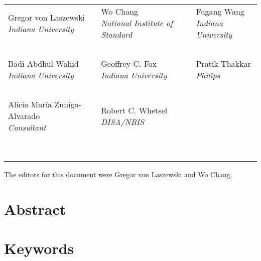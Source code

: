 \begin{center}
\parindent0pt 
\begin{tabular}{p{}p{}p{}}
 \makecell[l]{Gregor von Laszewski\\{\it Indiana University}} &
 \makecell[l]{Wo Chang\\{\it National Institute of Standard}} &
 \makecell[l]{Fugang Wang\\{\it Indiana University}}  \\
\multicolumn{3}{c}{~} \\
 \makecell[l]{Badi Abdhul Wahid\\{\it Indiana University}} & 
 \makecell[l]{Geoffrey C. Fox\\{\it Indiana University}} &
 \makecell[l]{Pratik Thakkar\\{\it Philips}} \\
\multicolumn{3}{c}{~} \\
 \makecell[l]{Alicia María Zuniga-Alvarado\\{\it Consultant}} &
 \makecell[l]{Robert C. Whetsel\\ {\it DISA/NBIS}} \\
 \makecell[l]{~\\~} \\
\end{tabular}
\end{center}

\parindent0pt The editors for this document were Gregor von Laszewski
and Wo Chang.

\newpage

\section*{\hfil \hspace{4cm} Abstract \hfil}
\ABSTRACT

\section*{\hfil  \hspace{4cm} Keywords \hfil}
\KEYWORDS

\newpage



\newpage

%  
  



\newpage

\tableofcontents

\listoffigures

\listoftables

\listoflistings
 
